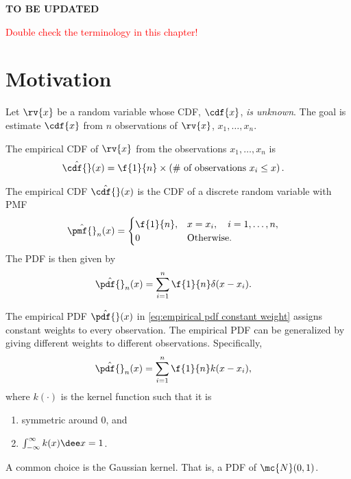 \begin{center}
    \Huge
    \textbf{TO BE UPDATED}
    
    \textcolor{red}{
    Double check the terminology in this chapter!
    }
\end{center}


\section{Motivation}
Let $\rv{x}$ be a random variable whose CDF, $\cdf{x}$, \emph{is unknown}. The goal is estimate $\cdf{x}$ from $n$ observations of $\rv{x}$, $x_{1}, \ldots, x_{n}$.

\begin{mydefinition}
    The empirical CDF of $\rv{x}$ from the observations $x_{1}, \ldots, x_{n}$ is
    \begin{align}
        \hat{\cdf{}}(x) &= \f{1}{n} \times \left( \# \text{ of observations } x_{i} \leq x \right).
    \end{align}
\end{mydefinition}
The empirical CDF $\hat{\cdf{}}(x)$ is the CDF of a discrete random variable with PMF
\begin{align}
    \hat{\pmf{}}_{n}(x) &= 
    \begin{cases}
        \f{1}{n}, & x = x_{i}, \quad i = 1,\ldots, n,\\
        0 & \text{Otherwise}.
    \end{cases}
\end{align}
The PDF is then given by
\begin{align}
    \label{eq:empirical pdf constant weight}
    \hat{\pdf{}}_{n}(x) &= \sum_{i=1}^{n}\f{1}{n}\delta(x-x_{i}).
\end{align}

The empirical PDF $\hat{\pdf{}}(x)$ in \eqref{eq:empirical pdf constant weight} assigns constant weights to every observation. The empirical PDF can be generalized by giving different weights to different observations. Specifically,
\begin{align}
    \hat{\pdf{}}_{n}(x) &= \sum_{i=1}^{n}\f{1}{n}k(x-x_{i}),
\end{align}
where $k(\cdot)$ is the kernel function such that it is
\begin{enumerate}
    \item symmetric around 0, and
    \item $\int_{-\infty}^{\infty}k(x)\dee x = 1$.
\end{enumerate}
A common choice is the Gaussian kernel. That is, a PDF of $\mc{N}(0,1)$.


